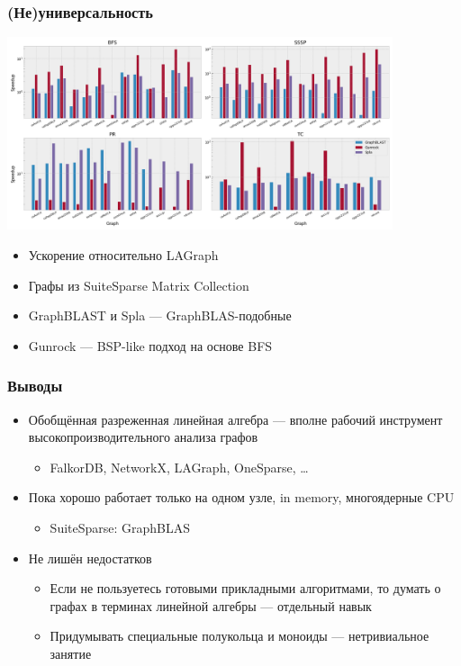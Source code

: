 \documentclass[xcolor=table,aspectratio=169]{beamer}
\begin{document}
\begin{frame}[fragile]
  \frametitle{(Не)универсальность}
  \begin{center}
    \includegraphics[width=0.85\textwidth]{pictures/rq1_rel.png}
  
  \scriptsize
  \begin{minipage}{0.49\textwidth}
  \begin{itemize}
  \item Ускорение относительно LAGraph 
  \item Графы из SuiteSparse Matrix Collection
  \end{itemize}
\end{minipage}
\begin{minipage}{0.49\textwidth}
  \begin{itemize}
  \item GraphBLAST и Spla --- GraphBLAS-подобные
  \item Gunrock --- BSP-like подход на основе BFS
  \end{itemize}
\end{minipage}
\end{center}  
\end{frame}

\begin{frame}[fragile]
  \frametitle{Выводы}
  \begin{itemize}
    \item Обобщённая разреженная линейная алгебра --- вполне рабочий инструмент высокопроизводительного анализа графов 
    \begin{itemize}
      \item FalkorDB, NetworkX, LAGraph, OneSparse, \ldots
    \end{itemize}
    \item Пока хорошо работает только на одном узле, in memory, многоядерные CPU
    \begin{itemize}
      \item SuiteSparse: GraphBLAS
    \end{itemize}
    \item Не лишён недостатков
    \begin{itemize}
      \item Если не пользуетесь готовыми прикладными алгоритмами, то думать о графах в терминах линейной алгебры --- отдельный навык
      \item Придумывать специальные полукольца и моноиды --- нетривиальное занятие
    \end{itemize}
  \end{itemize}
\end{frame}
\end{document}
